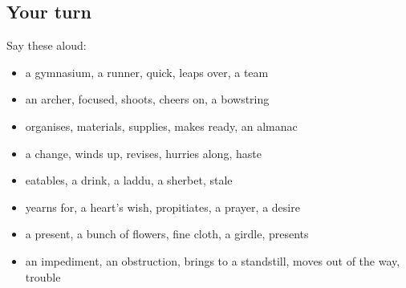 \subsection*{Your turn}
Say these aloud:

\begin{itemize}
\raggedright
  \item a gymnasium, a runner, quick, leaps over, a team
  \item an archer, focused, shoots, cheers on, a bowstring
  \item organises, materials, supplies, makes ready, an almanac
  \item a change, winds up, revises, hurries along, haste
  \item eatables, a drink, a laddu, a sherbet, stale
  \item yearns for, a heart's wish, propitiates, a prayer, a desire
  \item a present, a bunch of flowers, fine cloth, a girdle, presents
  \item an impediment, an obstruction, brings to a standstill, moves out of the way, trouble
\end{itemize}

